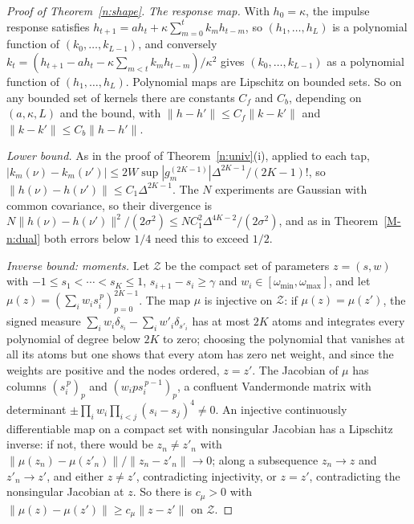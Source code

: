 \documentclass[12pt]{article}
\theoremstyle{definition}
\theoremstyle{remark}
\begin{document}
\begin{proof}[Proof of Theorem~\ref{n:shape}]
\emph{The response map.} With $h_0=\kappa$, the impulse response satisfies $h_{t+1}=ah_t+\kappa\sum_{m=0}^tk_mh_{t-m}$, so $(h_1,\ldots,h_L)$ is a polynomial function of $(k_0,\ldots,k_{L-1})$, and conversely $k_t=(h_{t+1}-ah_t-\kappa\sum_{m<t}k_mh_{t-m})/\kappa^2$ gives $(k_0,\ldots,k_{L-1})$ as a polynomial function of $(h_1,\ldots,h_L)$. Polynomial maps are Lipschitz on bounded sets. So on any bounded set of kernels there are constants $C_f$ and $C_b$, depending on $(a,\kappa,L)$ and the bound, with $\|h-h'\|\le C_f\|k-k'\|$ and $\|k-k'\|\le C_b\|h-h'\|$.

\emph{Lower bound.} As in the proof of Theorem~\ref{n:univ}(i), applied to each tap, $|k_m(\nu)-k_m(\nu')|\le2W\sup|g_m^{(2K-1)}|\Delta^{2K-1}/(2K-1)!$, so $\|h(\nu)-h(\nu')\|\le C_1\Delta^{2K-1}$. The $N$ experiments are Gaussian with common covariance, so their divergence is $N\|h(\nu)-h(\nu')\|^2/(2\sigma^2)\le NC_1^2\Delta^{4K-2}/(2\sigma^2)$, and as in Theorem~\ref{M-n:dual} both errors below $1/4$ need this to exceed $1/2$.

\emph{Inverse bound: moments.} Let $\mathcal Z$ be the compact set of parameters $z=(s,w)$ with $-1\le s_1<\cdots<s_K\le1$, $s_{i+1}-s_i\ge\gamma$ and $w_i\in[\omega_{\min},\omega_{\max}]$, and let $\mu(z)=(\sum_iw_is_i^{\,p})_{p=0}^{2K-1}$. The map $\mu$ is injective on $\mathcal Z$: if $\mu(z)=\mu(z')$, the signed measure $\sum_iw_i\delta_{s_i}-\sum_iw'_i\delta_{s'_i}$ has at most $2K$ atoms and integrates every polynomial of degree below $2K$ to zero; choosing the polynomial that vanishes at all its atoms but one shows that every atom has zero net weight, and since the weights are positive and the nodes ordered, $z=z'$. The Jacobian of $\mu$ has columns $(s_i^{\,p})_p$ and $(w_ips_i^{\,p-1})_p$, a confluent Vandermonde matrix with determinant $\pm\prod_iw_i\prod_{i<j}(s_i-s_j)^4\ne0$. An injective continuously differentiable map on a compact set with nonsingular Jacobian has a Lipschitz inverse: if not, there would be $z_n\ne z'_n$ with $\|\mu(z_n)-\mu(z'_n)\|/\|z_n-z'_n\|\to0$; along a subsequence $z_n\to z$ and $z'_n\to z'$, and either $z\ne z'$, contradicting injectivity, or $z=z'$, contradicting the nonsingular Jacobian at $z$. So there is $c_\mu>0$ with $\|\mu(z)-\mu(z')\|\ge c_\mu\|z-z'\|$ on $\mathcal Z$.


\end{proof}
\end{document}
